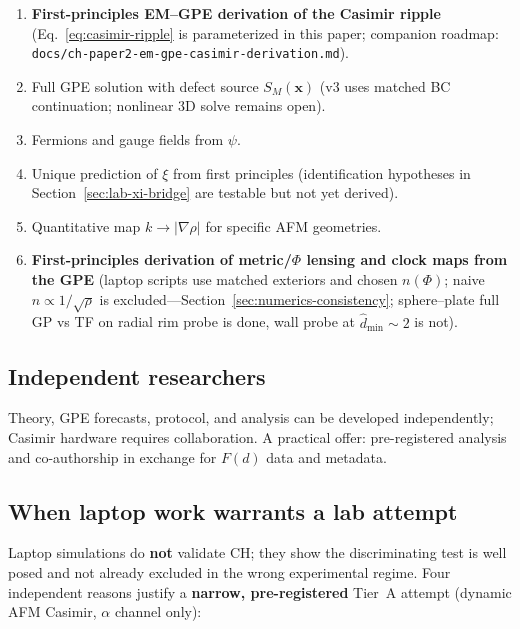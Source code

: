 \documentclass[11pt,a4paper]{article}
\begin{document}
\begin{enumerate}[label=\arabic*., leftmargin=*]
  \item \textbf{First-principles EM--GPE derivation of the Casimir ripple} (Eq.~\ref{eq:casimir-ripple} is parameterized in this paper; companion roadmap: \texttt{docs/ch-paper2-em-gpe-casimir-derivation.md}).
  \item Full GPE solution with defect source $S_M(\mathbf{x})$ (v3 uses matched BC continuation; nonlinear 3D solve remains open).
  \item Fermions and gauge fields from $\psi$.
  \item Unique prediction of $\xi$ from first principles (identification hypotheses in Section~\ref{sec:lab-xi-bridge} are testable but not yet derived).
  \item Quantitative map $k \to |\nabla\rho|$ for specific AFM geometries.
  \item \textbf{First-principles derivation of metric/$\Phi$ lensing and clock maps from the GPE} (laptop scripts use matched exteriors and chosen $n(\Phi)$; naive $n \propto 1/\sqrt{\rho}$ is excluded---Section~\ref{sec:numerics-consistency}; sphere--plate full GP vs TF on radial rim probe is done, wall probe at $\hat{d}_{\min}\sim 2$ is not).
\end{enumerate}

\subsection{Independent researchers}

Theory, GPE forecasts, protocol, and analysis can be developed independently; Casimir hardware requires collaboration.
A practical offer: pre-registered analysis and co-authorship in exchange for $F(d)$ data and metadata.

\subsection{When laptop work warrants a lab attempt}
\label{sec:lab-warrant}

Laptop simulations do \textbf{not} validate CH; they show the discriminating test is well posed and not already excluded in the wrong experimental regime.
Four independent reasons justify a \textbf{narrow, pre-registered} Tier~A attempt (dynamic AFM Casimir, $\alpha$ channel only):
\end{document}
